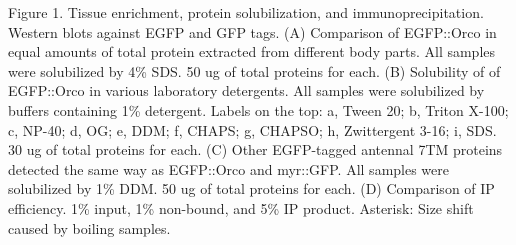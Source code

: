 Figure 1. Tissue enrichment, protein solubilization, and immunoprecipitation. Western blots against EGFP and GFP tags. (A) Comparison of EGFP::Orco in equal amounts of total protein extracted from different body parts. All samples were solubilized by 4\% SDS. 50 ug of total proteins for each. (B) Solubility of of EGFP::Orco in various laboratory detergents. All samples were solubilized by buffers containing 1\% detergent. Labels on the top: a, Tween 20; b, Triton X-100; c, NP-40; d, OG; e, DDM; f, CHAPS; g, CHAPSO; h, Zwittergent 3-16; i, SDS. 30 ug of total proteins for each. (C) Other EGFP-tagged antennal 7TM proteins detected the same way as EGFP::Orco and myr::GFP. All samples were solubilized by 1\% DDM. 50 ug of total proteins for each. (D) Comparison of IP efficiency. 1\% input, 1\% non-bound, and 5\% IP product. Asterisk: Size shift caused by boiling samples.
